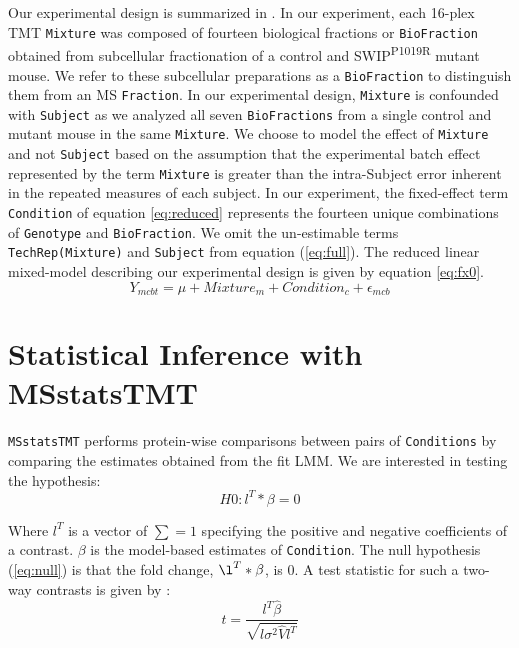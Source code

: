 \documentclass[11pt]{elife}\usepackage[]{graphicx}\usepackage[]{color}
\begin{document}
Our experimental design is summarized in .  In our experiment, each
16-plex TMT \texttt{Mixture} was composed of fourteen biological fractions or
\texttt{BioFraction} obtained from subcellular fractionation of a control and
SWIP\textsuperscript{P1019R} mutant mouse.  We refer to these subcellular
preparations as a \texttt{BioFraction} to distinguish them from an MS
\texttt{Fraction}. In our experimental design, \texttt{Mixture} is confounded
with \texttt{Subject} as we analyzed all seven \texttt{BioFractions} from a
single control and mutant mouse in the same \texttt{Mixture}.  We choose to
model the effect of \texttt{Mixture} and not \texttt{Subject} based on the
assumption that the experimental batch effect represented by the term
\texttt{Mixture} is greater than the intra-Subject error inherent in the
repeated measures of each subject.  In our experiment, the fixed-effect term
\texttt{Condition} of equation \ref{eq:reduced} represents the fourteen unique
combinations of \texttt{Genotype} and \texttt{BioFraction}.  We omit the
un-estimable terms \texttt{TechRep(Mixture)} and \texttt{Subject} from equation
(\ref{eq:full}). The reduced linear mixed-model describing our experimental
design is given by equation \ref{eq:fx0}.
\begin{equation}
	\label{eq:fx0}
	Y_{mcbt} = \mu + Mixture_m + Condition_c + \epsilon_{mcb}
\end{equation}


\section{Statistical Inference with MSstatsTMT}

\texttt{MSstatsTMT} performs protein-wise comparisons between pairs of 
\texttt{Conditions} by comparing the estimates obtained from the fit LMM. 
We are interested in testing the hypothesis:
\begin{equation}
	\label{eq:null} %
	H0 : l^T * \beta = 0 
\end{equation}

Where $l^T$ is a vector of $\sum=1$ specifying the positive and negative
coefficients of a contrast. $\beta$ is the model-based estimates of
\texttt{Condition}.  The null hypothesis (\ref{eq:null}) is that the fold
change, $\l^T * \beta$, is 0.  A test statistic for such a two-way contrasts is
given by \cite{Kuznetsova2017}:
\begin{equation} 
	\label{eq:tstatistic} %
	t = \frac{l^T \hat{\beta}}{\sqrt{l \sigma^2 \hat{V} l^T}}
\end{equation}
\end{document}
